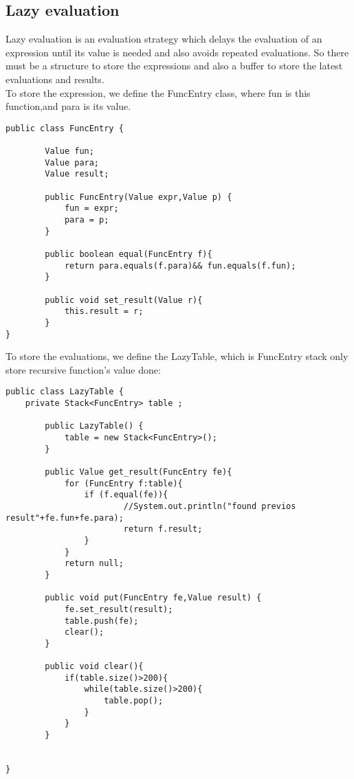 \documentclass[paper=a4, fontsize=11pt]{scrartcl}
\begin{document}
\subsection{Lazy evaluation}
Lazy evaluation is an evaluation strategy which delays the evaluation of an expression until its value is needed and also avoids repeated evaluations. So there must be a structure to store the expressions and also a buffer to store the latest evaluations and results.  \\
To store the expression, we define the FuncEntry class, where fun is this function,and para is its value.
\begin{lstlisting}[title=FuncEntry.java, frame=shadowbox]
public class FuncEntry {

        Value fun;
        Value para;
        Value result;
        
        public FuncEntry(Value expr,Value p) {
            fun = expr;
            para = p;
        }
        
        public boolean equal(FuncEntry f){
            return para.equals(f.para)&& fun.equals(f.fun);        
        }
        
        public void set_result(Value r){
            this.result = r;
        }
}
\end{lstlisting}
To store the evaluations, we define the LazyTable, which is FuncEntry stack only store recursive function’s value done:
\begin{lstlisting}[title=LazyTable.java, frame=shadowbox]
public class LazyTable {
    private Stack<FuncEntry> table ;
        
        public LazyTable() {
            table = new Stack<FuncEntry>();
        }
               
        public Value get_result(FuncEntry fe){
            for (FuncEntry f:table){
                if (f.equal(fe)){
                        //System.out.println("found previos result"+fe.fun+fe.para);
                        return f.result;
                }
            }
            return null;
        }
        
        public void put(FuncEntry fe,Value result) {
            fe.set_result(result);
            table.push(fe);
            clear();
        }
        
        public void clear(){
            if(table.size()>200){
                while(table.size()>200){
                    table.pop();
                }
            }
        }
        
        
}
\end{lstlisting}
\end{document}
